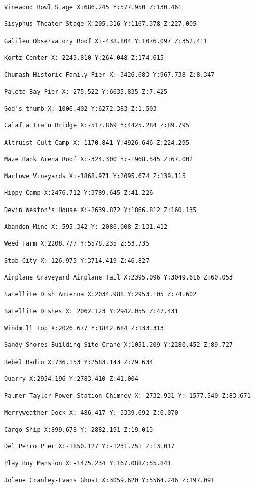 \documentclass[
  openany]{book}
\begin{document}
\begin{verbatim}
Vinewood Bowl Stage X:686.245 Y:577.950 Z:130.461

Sisyphus Theater Stage X:205.316 Y:1167.378 Z:227.005

Galileo Observatory Roof X:-438.804 Y:1076.097 Z:352.411

Kortz Center X:-2243.810 Y:264.048 Z:174.615

Chumash Historic Family Pier X:-3426.683 Y:967.738 Z:8.347

Paleto Bay Pier X:-275.522 Y:6635.835 Z:7.425

God's thumb X:-1006.402 Y:6272.383 Z:1.503

Calafia Train Bridge X:-517.869 Y:4425.284 Z:89.795

Altruist Cult Camp X:-1170.841 Y:4926.646 Z:224.295

Maze Bank Arena Roof X:-324.300 Y:-1968.545 Z:67.002

Marlowe Vineyards X:-1868.971 Y:2095.674 Z:139.115

Hippy Camp X:2476.712 Y:3789.645 Z:41.226

Devin Weston's House X:-2639.872 Y:1866.812 Z:160.135

Abandon Mine X:-595.342 Y: 2086.008 Z:131.412

Weed Farm X:2208.777 Y:5578.235 Z:53.735

Stab City X: 126.975 Y:3714.419 Z:46.827

Airplane Graveyard Airplane Tail X:2395.096 Y:3049.616 Z:60.053

Satellite Dish Antenna X:2034.988 Y:2953.105 Z:74.602

Satellite Dishes X: 2062.123 Y:2942.055 Z:47.431

Windmill Top X:2026.677 Y:1842.684 Z:133.313

Sandy Shores Building Site Crane X:1051.209 Y:2280.452 Z:89.727

Rebel Radio X:736.153 Y:2583.143 Z:79.634

Quarry X:2954.196 Y:2783.410 Z:41.004

Palmer-Taylor Power Station Chimney X: 2732.931 Y: 1577.540 Z:83.671

Merryweather Dock X: 486.417 Y:-3339.692 Z:6.070

Cargo Ship X:899.678 Y:-2882.191 Z:19.013

Del Perro Pier X:-1850.127 Y:-1231.751 Z:13.017

Play Boy Mansion X:-1475.234 Y:167.088Z:55.841

Jolene Cranley-Evans Ghost X:3059.620 Y:5564.246 Z:197.091


\end{verbatim}
\end{document}
